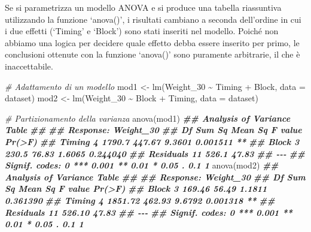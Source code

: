 \documentclass[
  12pt,
]{book}
\newenvironment{Shaded}{\begin{snugshade}}{\end{snugshade}}
\newcommand{\AttributeTok}[1]{\textcolor[rgb]{0.77,0.63,0.00}{#1}}
\newcommand{\CommentTok}[1]{\textcolor[rgb]{0.56,0.35,0.01}{\textit{#1}}}
\newcommand{\DocumentationTok}[1]{\textcolor[rgb]{0.56,0.35,0.01}{\textbf{\textit{#1}}}}
\newcommand{\FunctionTok}[1]{\textcolor[rgb]{0.00,0.00,0.00}{#1}}
\newcommand{\NormalTok}[1]{#1}
\newcommand{\OtherTok}[1]{\textcolor[rgb]{0.56,0.35,0.01}{#1}}
\newcommand{\SpecialCharTok}[1]{\textcolor[rgb]{0.00,0.00,0.00}{#1}}
\begin{document}
Se si parametrizza un modello ANOVA e si produce una tabella riassuntiva utilizzando la funzione `anova()', i risultati cambiano a seconda dell'ordine in cui i due effetti (`Timing' e `Block') sono stati inseriti nel modello. Poiché non abbiamo una logica per decidere quale effetto debba essere inserito per primo, le conclusioni ottenute con la funzione `anova()' sono puramente arbitrarie, il che è inaccettabile.

\begin{Shaded}
\begin{Highlighting}[]
\CommentTok{\# Adattamento di un modello}
\NormalTok{mod1 }\OtherTok{\textless{}{-}} \FunctionTok{lm}\NormalTok{(Weight\_30 }\SpecialCharTok{\textasciitilde{}}\NormalTok{ Timing }\SpecialCharTok{+}\NormalTok{ Block, }\AttributeTok{data =}\NormalTok{ dataset)}
\NormalTok{mod2 }\OtherTok{\textless{}{-}} \FunctionTok{lm}\NormalTok{(Weight\_30 }\SpecialCharTok{\textasciitilde{}}\NormalTok{ Block }\SpecialCharTok{+}\NormalTok{ Timing, }\AttributeTok{data =}\NormalTok{ dataset)}

\CommentTok{\# Partizionamento della varianza}
\FunctionTok{anova}\NormalTok{(mod1)}
\DocumentationTok{\#\# Analysis of Variance Table}
\DocumentationTok{\#\# }
\DocumentationTok{\#\# Response: Weight\_30}
\DocumentationTok{\#\#           Df Sum Sq Mean Sq F value   Pr(\textgreater{}F)   }
\DocumentationTok{\#\# Timing     4 1790.7  447.67  9.3601 0.001511 **}
\DocumentationTok{\#\# Block      3  230.5   76.83  1.6065 0.244040   }
\DocumentationTok{\#\# Residuals 11  526.1   47.83                    }
\DocumentationTok{\#\# {-}{-}{-}}
\DocumentationTok{\#\# Signif. codes:  0 \textquotesingle{}***\textquotesingle{} 0.001 \textquotesingle{}**\textquotesingle{} 0.01 \textquotesingle{}*\textquotesingle{} 0.05 \textquotesingle{}.\textquotesingle{} 0.1 \textquotesingle{} \textquotesingle{} 1}
\FunctionTok{anova}\NormalTok{(mod2)}
\DocumentationTok{\#\# Analysis of Variance Table}
\DocumentationTok{\#\# }
\DocumentationTok{\#\# Response: Weight\_30}
\DocumentationTok{\#\#           Df  Sum Sq Mean Sq F value   Pr(\textgreater{}F)   }
\DocumentationTok{\#\# Block      3  169.46   56.49  1.1811 0.361390   }
\DocumentationTok{\#\# Timing     4 1851.72  462.93  9.6792 0.001318 **}
\DocumentationTok{\#\# Residuals 11  526.10   47.83                    }
\DocumentationTok{\#\# {-}{-}{-}}
\DocumentationTok{\#\# Signif. codes:  0 \textquotesingle{}***\textquotesingle{} 0.001 \textquotesingle{}**\textquotesingle{} 0.01 \textquotesingle{}*\textquotesingle{} 0.05 \textquotesingle{}.\textquotesingle{} 0.1 \textquotesingle{} \textquotesingle{} 1}
\end{Highlighting}
\end{Shaded}
\end{document}
